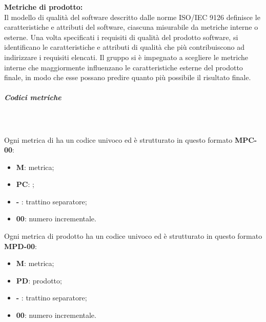 \textbf{Metriche di prodotto:}\\
Il modello di qualità del software descritto dalle norme ISO/IEC 9126 definisce le caratteristiche e attributi del software, ciascuna misurabile da metriche interne o esterne.
Una volta specificati i requisiti di qualità del prodotto software, si identificano le caratteristiche e attributi di qualità che più contribuiscono ad indirizzare i requisiti elencati.
Il gruppo \Gruppo{} si è impegnato a scegliere le metriche interne che maggiormente influenzano le caratteristiche esterne del prodotto finale, in modo che esse possano predire quanto più possibile il risultato finale.

\subparagraph{Codici metriche}\mbox{}\\ \\
Ogni metrica di  ha un codice univoco ed è strutturato in questo formato \textbf{MPC-00}:
\begin{itemize}
    \item \textbf{M}: metrica;
    \item \textbf{PC}: ;
    \item \textbf{-} : trattino separatore;
    \item \textbf{00}: numero incrementale.
\end{itemize}
Ogni metrica di prodotto ha un codice univoco ed è strutturato in questo formato \textbf{MPD-00}:
\begin{itemize}
    \item \textbf{M}: metrica;
    \item \textbf{PD}: prodotto;
    \item \textbf{-} : trattino separatore;
    \item \textbf{00}: numero incrementale.
\end{itemize}

